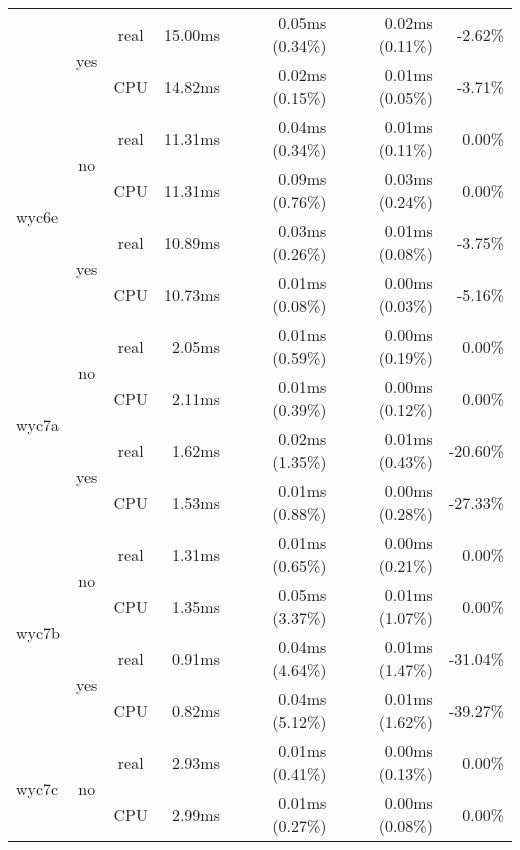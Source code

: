 \documentclass[en]{pracamgr}
\begin{document}
\begin{appendices}
\begin{small}
\begin{longtable}{|l|c|c|r|r|r|r|}
                          \cline{2-7}
                          & \multirow{2}{*}{yes} & real & 15.00ms & 0.05ms (0.34\%) & 0.02ms (0.11\%) & -2.62\% \\*
                          &                      & CPU  & 14.82ms & 0.02ms (0.15\%) & 0.01ms (0.05\%) & -3.71\% \\
\hline
\multirow{4}{*}{wyc6e}    & \multirow{2}{*}{no}  & real & 11.31ms & 0.04ms (0.34\%) & 0.01ms (0.11\%) & 0.00\% \\*
                          &                      & CPU  & 11.31ms & 0.09ms (0.76\%) & 0.03ms (0.24\%) & 0.00\% \\*
                          \cline{2-7}
                          & \multirow{2}{*}{yes} & real & 10.89ms & 0.03ms (0.26\%) & 0.01ms (0.08\%) & -3.75\% \\*
                          &                      & CPU  & 10.73ms & 0.01ms (0.08\%) & 0.00ms (0.03\%) & -5.16\% \\
\hline
\multirow{4}{*}{wyc7a}    & \multirow{2}{*}{no}  & real & 2.05ms & 0.01ms (0.59\%) & 0.00ms (0.19\%) & 0.00\% \\*
                          &                      & CPU  & 2.11ms & 0.01ms (0.39\%) & 0.00ms (0.12\%) & 0.00\% \\*
                          \cline{2-7}
                          & \multirow{2}{*}{yes} & real & 1.62ms & 0.02ms (1.35\%) & 0.01ms (0.43\%) & -20.60\% \\*
                          &                      & CPU  & 1.53ms & 0.01ms (0.88\%) & 0.00ms (0.28\%) & -27.33\% \\
\hline
\multirow{4}{*}{wyc7b}    & \multirow{2}{*}{no}  & real & 1.31ms & 0.01ms (0.65\%) & 0.00ms (0.21\%) & 0.00\% \\*
                          &                      & CPU  & 1.35ms & 0.05ms (3.37\%) & 0.01ms (1.07\%) & 0.00\% \\*
                          \cline{2-7}
                          & \multirow{2}{*}{yes} & real & 0.91ms & 0.04ms (4.64\%) & 0.01ms (1.47\%) & -31.04\% \\*
                          &                      & CPU  & 0.82ms & 0.04ms (5.12\%) & 0.01ms (1.62\%) & -39.27\% \\
\hline
\multirow{4}{*}{wyc7c}    & \multirow{2}{*}{no}  & real & 2.93ms & 0.01ms (0.41\%) & 0.00ms (0.13\%) & 0.00\% \\*
                          &                      & CPU  & 2.99ms & 0.01ms (0.27\%) & 0.00ms (0.08\%) & 0.00\% \\*

\end{longtable}
\end{small}
\end{appendices}
\end{document}
